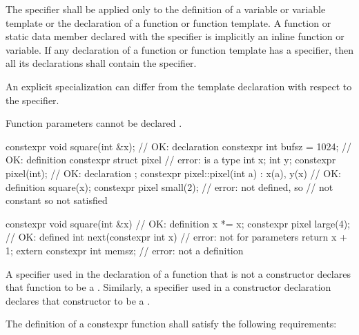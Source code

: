 \pnum
The  specifier shall be applied only to the definition of
a variable or variable template or
the declaration of a
function or function template.
A function or static data member declared with the 
specifier is implicitly an inline function or variable.
If any declaration of a function or function template has
a  specifier,
then all its declarations shall contain the  specifier. \begin{note} An
explicit specialization can differ from the template declaration with respect to the
 specifier. \end{note}
\begin{note}
Function parameters cannot be declared .\end{note}
\begin{example}
\begin{codeblock}
constexpr void square(int &x);  // OK: declaration
constexpr int bufsz = 1024;     // OK: definition
constexpr struct pixel {        // error:  is a type
  int x;
  int y;
  constexpr pixel(int);         // OK: declaration
};
constexpr pixel::pixel(int a)
  : x(a), y(x)                  // OK: definition
  { square(x); }
constexpr pixel small(2);       // error:  not defined, so 
                                // not constant so  not satisfied

constexpr void square(int &x) { // OK: definition
  x *= x;
}
constexpr pixel large(4);       // OK:  defined
int next(constexpr int x) {     // error: not for parameters
     return x + 1;
}
extern constexpr int memsz;     // error: not a definition
\end{codeblock}
\end{example}

\pnum
A  specifier used in the declaration of a function that is not a
constructor declares that
function to be a . Similarly, a
 specifier used in
a constructor declaration declares that constructor to be a
.

\pnum
{}
The definition of a constexpr function shall satisfy the following
requirements:

